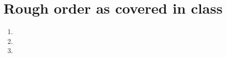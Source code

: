 \documentclass{article}
\begin{document}
\section{Rough order as covered in class}

\begin{enumerate}
	\item
	\item
	\item
\end{enumerate}
\end{document}
